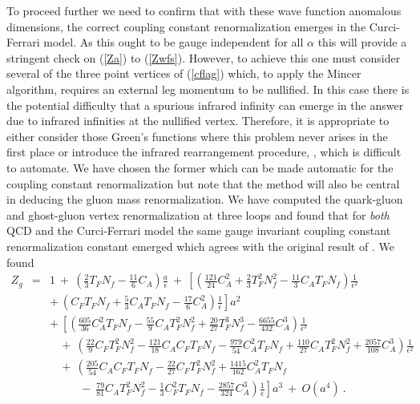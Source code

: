 \documentclass[a4paper,11pt]{article}
\newcommand{\Nf}{N_{\!f}}
\begin{document}
To proceed further we need to confirm that with these wave function anomalous
dimensions, the correct coupling constant renormalization emerges in the
Curci-Ferrari model. As this ought to be gauge independent for all $\alpha$
this will provide a stringent check on (\ref{Za}) to (\ref{Zwfs}). However, to 
achieve this one must consider several of the three point vertices of 
(\ref{cflag}) which, to apply the {\sc Mincer} algorithm, requires an external 
leg momentum to be nullified. In this case there is the potential difficulty 
that a spurious infrared infinity can emerge in the answer due to infrared 
infinities at the nullified vertex. Therefore, it is appropriate to either 
consider those Green's functions where this problem never arises in the first 
place or introduce the infrared rearrangement procedure, \cite{41,42}, which is
difficult to automate. We have chosen the former which can be made automatic 
for the coupling constant renormalization but note that the method will also be
central in deducing the gluon mass renormalization. We have computed the 
quark-gluon and ghost-gluon vertex renormalization at three loops and found 
that for {\em both} QCD and the Curci-Ferrari model the same gauge invariant 
coupling constant renormalization constant emerged which agrees with the 
original result of \cite{43}. We found  
\begin{eqnarray} 
Z_g &=& 1 ~+~ \left( \frac{2}{3} T_F \Nf - \frac{11}{6} C_A \right) 
\frac{a}{\epsilon} ~+~ \left[ \left( \frac{121}{24}C_A^2 + \frac{2}{3} T_F^2
\Nf^2 - \frac{11}{3} C_A T_F \Nf \right) \frac{1}{\epsilon^2} \right. 
\nonumber \\ 
&& \left. +~ \left( C_F T_F \Nf + \frac{5}{3} C_A T_F \Nf - \frac{17}{6} 
C_A^2 \right) \frac{1}{\epsilon} \right] a^2 \nonumber \\  
&& +~ \left[ \left( \frac{605}{36} C_A^2 T_F \Nf - \frac{55}{9} C_A T_F^2 \Nf^2
+ \frac{20}{27} T_F^3 \Nf^3 - \frac{6655}{432} C_A^3 \right) 
\frac{1}{\epsilon^3} \right. \nonumber \\ 
&& \left. ~~~~+~ \left( \frac{22}{9} C_F T_F^2 \Nf^2 - \frac{121}{18} 
C_A C_F T_F \Nf - \frac{979}{54} C_A^2 T_F \Nf + \frac{110}{27} C_A T_F^2 \Nf^2
+ \frac{2057}{108} C_A^3 \right) \frac{1}{\epsilon^2} \right. \nonumber \\
&& \left. ~~~~+~ \left( \frac{205}{54} C_A C_F T_F \Nf 
- \frac{22}{27} C_F T_F^2 \Nf^2 + \frac{1415}{162} C_A^2 T_F \Nf 
\right. \right. \nonumber \\ 
&& \left. \left. ~~~~~~~~~~~~-~ \frac{79}{81} C_A T_F^2 \Nf^2 
- \frac{1}{3} C_F^2 T_F \Nf - \frac{2857}{324} C_A^3 \right) \frac{1}{\epsilon}
\right] a^3 ~+~ O(a^4) ~. 
\end{eqnarray}  
\end{document}
